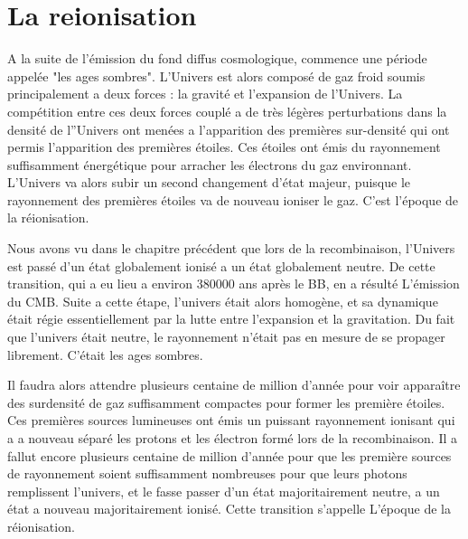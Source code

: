 \chapter{La reionisation} 
%
%
%
%



A la suite de l'émission du fond diffus cosmologique, commence une période appelée "les ages sombres".
L'Univers est alors composé de gaz froid soumis principalement a deux forces : la gravité et l'expansion de l'Univers.
La compétition entre ces deux forces couplé a de très légères perturbations dans la densité de l''Univers ont menées a l'apparition des premières sur-densité qui ont permis l'apparition des premières étoiles.
Ces étoiles ont émis du rayonnement suffisamment énergétique pour arracher les électrons du gaz environnant.
L'Univers va alors subir un second changement d'état majeur, puisque le rayonnement des premières étoiles va de nouveau ioniser le gaz.
C'est l'époque de la réionisation.


Nous avons vu dans le chapitre précédent que lors de la recombinaison, l'Univers est passé d'un état globalement ionisé a un état globalement neutre.
De cette transition, qui a eu lieu a environ 380000 ans après le BB, en a résulté L’émission du CMB.
Suite a cette étape, l'univers était alors homogène, et sa dynamique était régie essentiellement par la lutte entre l'expansion et la gravitation.
Du fait que l'univers était neutre, le rayonnement n’était pas en mesure de se propager librement.
C’était les ages sombres.

Il faudra alors attendre plusieurs centaine de million d'année pour voir apparaître des surdensité de gaz suffisamment compactes pour former les première étoiles.
Ces premières sources lumineuses ont émis un puissant rayonnement ionisant qui a a nouveau séparé les protons et les électron formé lors de la recombinaison.
Il a fallut encore plusieurs centaine de million d'année pour que les première sources de rayonnement soient suffisamment nombreuses pour que leurs photons remplissent l'univers, et le fasse passer d'un état majoritairement neutre, a un état a nouveau majoritairement ionisé. 
Cette transition s’appelle L’époque de la réionisation.

